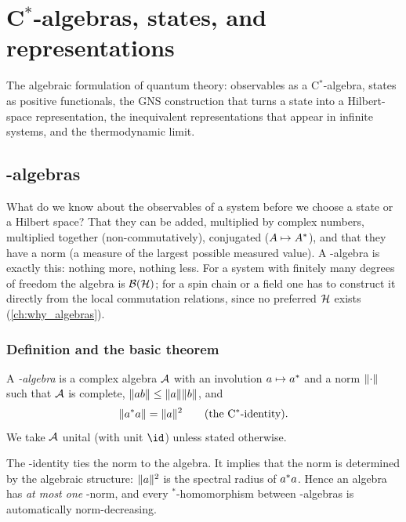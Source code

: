\chapter{C$^*$-algebras, states, and representations}\label{ch:cstar_states}

The algebraic formulation of quantum theory: observables as a C$^*$-algebra, states as positive functionals, the GNS construction that turns a state into a Hilbert-space representation, the inequivalent representations that appear in infinite systems, and the thermodynamic limit.

\section{\cstar-algebras}\label{ch:cstar}

\begin{physmotiv}
What do we know about the observables of a system before we choose a state or a Hilbert space? That they can be added, multiplied by complex numbers, multiplied together (non-commutatively), conjugated ($A\mapsto A^{*}$), and that they have a norm (a measure of the largest possible measured value). A \cstar-algebra is exactly this: nothing more, nothing less. For a system with finitely many degrees of freedom the algebra is $\mathcal{B}(\mathcal{H})$; for a spin chain or a field one has to construct it directly from the local commutation relations, since no preferred $\mathcal{H}$ exists (\cref{ch:why_algebras}).
\end{physmotiv}

\subsection{Definition and the basic theorem}

\begin{definition}
A \emph{\cstar-algebra} is a complex algebra $\mathcal{A}$ with an involution $a\mapsto a^{*}$ and a norm $\lVert \cdot\rVert$ such that $\mathcal{A}$ is complete, $\lVert ab\rVert\le\lVert a\rVert\lVert b\rVert$, and
\begin{equation}
\lVert a^{*} a\rVert=\lVert a\rVert^2\qquad(\text{the C$^*$-identity}).
\end{equation}
We take $\mathcal{A}$ unital (with unit $\id$) unless stated otherwise.
\end{definition}

The \cstar-identity ties the norm to the algebra. It implies that the norm is determined by the algebraic structure: $\lVert a\rVert^2$ is the spectral radius of $a^{*} a$. Hence an algebra has \emph{at most one} \cstar-norm, and every $^*$-homomorphism between \cstar-algebras is automatically norm-decreasing.

